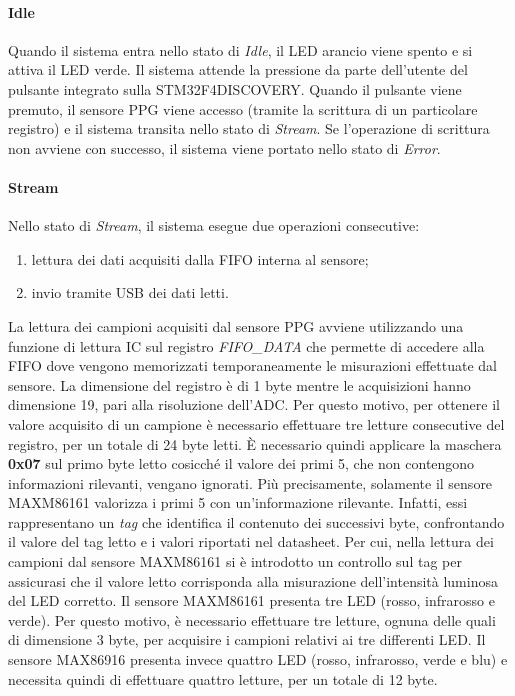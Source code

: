 \paragraph{Idle}
Quando il sistema entra nello stato di \textit{Idle}, il LED arancio viene spento e si attiva il LED verde. Il sistema attende la pressione da parte dell'utente del pulsante integrato sulla STM32F4DISCOVERY. Quando il pulsante viene premuto, il sensore PPG viene accesso (tramite la scrittura di un particolare registro) e il sistema transita nello stato di \textit{Stream}. Se l'operazione di scrittura non avviene con successo, il sistema viene portato nello stato di \textit{Error}.
\paragraph{Stream}
Nello stato di \textit{Stream}, il sistema esegue due operazioni consecutive:
\begin{enumerate}
	\item lettura dei dati acquisiti dalla FIFO interna al sensore;
	\item invio tramite USB dei dati letti.
\end{enumerate}
La lettura dei campioni acquisiti dal sensore PPG avviene utilizzando una funzione di lettura IC sul registro \textit{FIFO\_DATA} che permette di accedere alla FIFO dove vengono memorizzati temporaneamente le misurazioni effettuate dal sensore. La dimensione del registro è di 1 byte mentre le acquisizioni hanno dimensione \SI{19}{\bit}, pari alla risoluzione dell'ADC. Per questo motivo, per ottenere il valore acquisito di un campione è necessario effettuare tre letture consecutive del registro, per un totale di 24 byte letti. \`E necessario quindi applicare la maschera \textbf{0x07} sul primo byte letto cosicché il valore dei primi \SI{5}{\bit}, che non contengono informazioni rilevanti, vengano ignorati. Più precisamente, solamente il sensore MAXM86161 valorizza i primi \SI{5}{\bit} con un'informazione rilevante. Infatti, essi rappresentano un \textit{tag} che identifica il contenuto dei successivi byte, confrontando il valore del tag letto e i valori riportati nel datasheet. Per cui, nella lettura dei campioni dal sensore MAXM86161 si è introdotto un controllo sul tag per assicurasi che il valore letto corrisponda alla misurazione dell'intensità luminosa del LED corretto. Il sensore MAXM86161 presenta tre LED (rosso, infrarosso e verde). Per questo motivo, è necessario effettuare tre letture, ognuna delle quali di dimensione 3 byte, per acquisire i campioni relativi ai tre differenti LED. Il sensore MAX86916 presenta invece quattro LED (rosso, infrarosso, verde e blu) e necessita quindi di effettuare quattro letture, per un totale di 12 byte.


